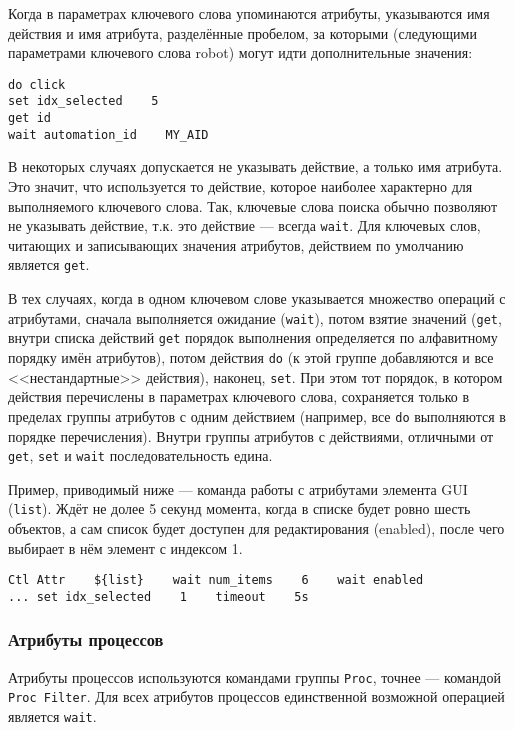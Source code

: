 \documentclass[11pt]{book} %
\begin{document}
Когда в параметрах ключевого слова упоминаются атрибуты, указываются имя действия и имя атрибута, разделённые пробелом, за которыми (следующими параметрами ключевого слова robot) могут идти дополнительные значения:

\begin{verbatim}
do click
set idx_selected    5
get id
wait automation_id    MY_AID
\end{verbatim}

В некоторых случаях допускается не указывать действие, а только имя атрибута. Это значит, что используется то действие, которое наиболее характерно для выполняемого ключевого слова. Так, ключевые слова поиска обычно позволяют не указывать действие, т.к. это действие --- всегда \verb|wait|. Для ключевых слов, читающих и записывающих значения атрибутов, действием по умолчанию является \verb|get|.

В тех случаях, когда в одном ключевом слове указывается множество операций с атрибутами, сначала выполняется ожидание (\verb|wait|), потом взятие значений (\verb|get|, внутри списка действий \verb|get| порядок выполнения определяется по алфавитному порядку имён атрибутов), потом действия \verb|do| (к этой группе добавляются и все <<нестандартные>> действия), наконец, \verb|set|. При этом тот порядок, в котором действия перечислены в параметрах ключевого слова, сохраняется только в пределах группы атрибутов с одним действием (например, все \verb|do| выполняются в порядке перечисления). Внутри группы атрибутов с действиями, отличными от \verb|get|, \verb|set| и \verb|wait| последовательность едина.

Пример, приводимый ниже --- команда работы с атрибутами элемента GUI (\verb|list|). Ждёт не долее 5 секунд момента, когда в списке будет ровно шесть объектов, а сам список будет доступен для редактирования (enabled), после чего выбирает в нём элемент с индексом 1.
\begin{verbatim}
Ctl Attr    ${list}    wait num_items    6    wait enabled 
... set idx_selected    1    timeout    5s
\end{verbatim}


\subsubsection{Атрибуты процессов}

Атрибуты процессов используются командами группы \verb|Proc|, точнее --- командой \verb|Proc Filter|. Для всех атрибутов процессов единственной возможной операцией является \verb|wait|.
\end{document}

